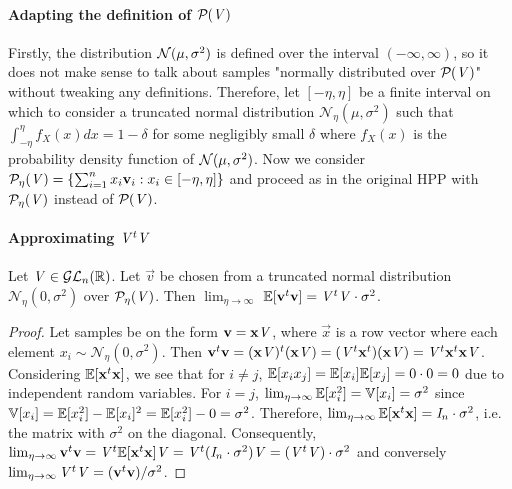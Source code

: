\paragraph{Adapting the definition of $\PP{V}$}
Firstly, the distribution $\normdist{\mu}{\sigma}$ is defined over the interval $(- \infty, \infty)$, so it does not make sense to talk about samples "normally distributed over $\PP{V}$" without tweaking any definitions.
Therefore, let $[- \eta, \eta]$ be a finite interval on which to consider a truncated normal distribution $\mathcal{N}_{\eta}(\mu, \sigma^2)$ such that $\int_{-\eta}^{\eta} f_X(x) dx = 1 - \delta$ for some negligibly small $\delta$
where $f_X(x)$ is the probability density function of $\normdist{\mu}{\sigma}$.
Now we consider $\PP[\eta]{V} = \{\sum_{i=1}^n x_i \vec{v}_i : x_i \in [-\eta, \eta]\}$ and proceed as in the original HPP with $\PP[\eta]{V}$ instead of $\PP{V}$.

\paragraph{Approximating $\mat{V}^t \mat{V}$}
Let $\mat{V} \in \GLnR$. Let $\vec{v}$ be chosen from a truncated normal distribution $\mathcal{N}_{\eta}(0, \sigma^2)$ over $\PP[\eta]{V}$.
Then $\lim_{\eta\to\infty}$ $\bb{E}[\vec{v}^t\vec{v}] = \mat{V}^t \mat{V} \cdot \sigma^2$.

\begin{proof}
    Let samples be on the form $\vec{v} = \vec{x}\mat{V}$, where $\vec{x}$ is a row vector where each element $x_i \sim \mathcal{N}_{\eta}(0, \sigma^2)$.
    Then $\vec{v}^t\vec{v} = (\vec{x} \mat{V})^t (\vec{x} \mat{V}) = (\mat{V}^t \vec{x}^t)(\vec{x} \mat{V}) = \mat{V}^t \vec{x}^t \vec{x} \mat{V}$. Considering $\bb{E}[\vec{x}^t \vec{x}]$, we see that for $i \neq j$, 
$\bb{E}[x_i x_j] = \bb{E}[x_i] \bb{E}[x_j] = 0 \cdot 0 = 0$ due to independent random variables.
For $i=j$, $\lim_{\eta\to\infty} \bb{E}[x_i^2] = \bb{V}[x_i] = \sigma^2$ since $\bb{V}[x_i] = \bb{E}[x_i^2] - \bb{E}[x_i]^2 = \bb{E}[x_i^2] - 0 = \sigma ^2$.
Therefore, $\lim_{\eta\to\infty} \bb{E}[\vec{x}^t \vec{x}] = \mat{I}_n \cdot \sigma^2$, i.e. the matrix with $\sigma ^2$ on the diagonal.
Consequently, $\lim_{\eta\to\infty} \vec{v}^t \vec{v} = \mat{V}^t \bb{E}[\vec{x}^t\vec{x}] \mat{V} = \mat{V}^t (\mat{I}_n \cdot \sigma^2) \mat{V} = (\mat{V}^t \mat{V}) \cdot \sigma ^2$ 
and conversely $\lim_{\eta\to\infty} \mat{V}^t \mat{V} = (\vec{v}^t \vec{v})/ \sigma^2$.
\end{proof}

